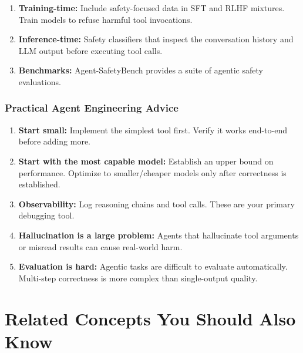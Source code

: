 \documentclass[11pt, a4paper]{article}
\begin{document}
\begin{defbox}
\begin{enumerate}[leftmargin=1.5em]
  \item \textbf{Training-time:} Include safety-focused data in SFT and RLHF mixtures. Train models to refuse harmful tool invocations.
  \item \textbf{Inference-time:} Safety classifiers that inspect the conversation history and LLM output before executing tool calls.
  \item \textbf{Benchmarks:} Agent-SafetyBench provides a suite of agentic safety evaluations.
\end{enumerate}
\end{defbox}

\subsubsection{Practical Agent Engineering Advice}

\begin{tealbox}
\begin{enumerate}[leftmargin=1.5em]
  \item \textbf{Start small:} Implement the simplest tool first. Verify it works end-to-end before adding more.
  \item \textbf{Start with the most capable model:} Establish an upper bound on performance. Optimize to smaller/cheaper models only after correctness is established.
  \item \textbf{Observability:} Log reasoning chains and tool calls. These are your primary debugging tool.
  \item \textbf{Hallucination is a large problem:} Agents that hallucinate tool arguments or misread results can cause real-world harm.
  \item \textbf{Evaluation is hard:} Agentic tasks are difficult to evaluate automatically. Multi-step correctness is more complex than single-output quality.
\end{enumerate}
\end{tealbox}

\newpage
\section{Related Concepts You Should Also Know}
\end{document}
